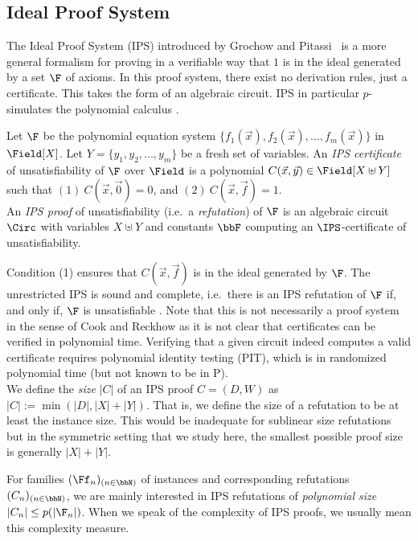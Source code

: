 \documentclass[a4paper,UKenglish,cleveref, autoref, thm-restate]{lipics-v2021}
\begin{document}
	
	
	
	\subsection{Ideal Proof System}
	\label{sec:IPS}
	The Ideal Proof System (IPS) introduced by Grochow and Pitassi~\cite{IPS} is a more general formalism for proving in a verifiable way that $1$ is in the ideal generated by a set $\F$ of axioms. In this proof system, there exist no derivation rules, just a certificate. This takes the form of an algebraic circuit. IPS in particular $p$-simulates the polynomial calculus \cite[Proposition 3.4]{IPS}.
	\begin{definition}
		Let $\F$ be the polynomial equation system $\{f_1(\vec x), f_2(\vec x), \ldots,f_m(\vec x)\}$
		in $\Field[X]$.
		Let $Y = \{y_1, y_2,...,y_m\}$ be a fresh set of variables.
		An \emph{IPS certificate} of unsatisfiability of $\F$ over $\Field$ is a polynomial
		$C(\vec x, \vec y) \in \Field[X \uplus Y]$ such that $(1) \ C(\vec x, \vec 0 ) = 0$, and $(2) \ C(\vec x, \vec f ) = 1$.\\
		An \emph{IPS proof} of unsatisfiability (i.e.\ a \emph{refutation}) of $\F$ is an algebraic circuit $\Circ$ with variables $X \uplus Y$ and constants $\bbF$ computing an $\IPS$-certificate of unsatisfiability.
	\end{definition}
	Condition (1) ensures that $C(\vec x, \vec f)$ is in the ideal generated by $\F$.
	The unrestricted IPS is sound and complete, i.e.\ there is an  IPS refutation of $\F$ if, and only if, $\F$ is unsatisfiable \cite{IPS}.  Note that this is not necessarily a proof system in the sense of Cook and Reckhow as it is not clear that certificates can be verified in polynomial time.   Verifying that a given circuit indeed computes a valid certificate requires polynomial identity testing (PIT), which is in randomized polynomial time (but not known to be in P).
	\\
	We define the \emph{size} $|C|$ of an IPS proof $C = (D,W)$ as 
	$
	|C| := \min(|D|, |X| + |Y|).
	$
	That is, we define the size of a refutation to be at least the instance size. 
	This would be inadequate for sublinear size refutations but in the symmetric setting that we study here, the smallest possible proof size is generally $|X| + |Y|$.
	
	For families $(\Ff_n)_{(n \in \bbN)}$ of instances and corresponding refutations $(C_n)_{(n \in \bbN)}$, we are mainly interested in IPS refutations of \emph{polynomial size} $|C_n| \leq p(|\F_n|)$.
	When we speak of the complexity of IPS proofs, we usually mean this complexity measure.
	
\end{document}
